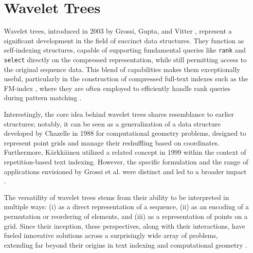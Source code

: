 \clearpage
\section{Wavelet Trees}

Wavelet trees, introduced in 2003 by Grossi, Gupta, and Vitter \cite{GrossiWT2003}, represent a significant development in the field of succinct data structures. They function as self-indexing structures, capable of supporting fundamental queries like \texttt{rank} and \texttt{select} directly on the compressed representation, while still permitting access to the original sequence data. This blend of capabilities makes them exceptionally useful, particularly in the construction of compressed full-text indexes such as the FM-index \cite{ferragina2000opportunistic}, where they are often employed to efficiently handle rank queries during pattern matching \cite{WTForALL}.

Interestingly, the core idea behind wavelet trees shares resemblance to earlier structures; notably, it can be seen as a generalization of a data structure developed by Chazelle in 1988 \cite{Chazelle1988} for computational geometry problems, designed to represent point grids and manage their reshuffling based on coordinates. Furthermore, Kärkkäinen utilized a related concept in 1999 \cite{karkkainen1999repetition} within the context of repetition-based text indexing. However, the specific formulation and the range of applications envisioned by Grossi et al. were distinct and led to a broader impact \cite{WTForALL}.

The versatility of wavelet trees stems from their ability to be interpreted in multiple ways: (i) as a direct representation of a sequence, (ii) as an encoding of a permutation or reordering of elements, and (iii) as a representation of points on a grid. Since their inception, these perspectives, along with their interactions, have fueled innovative solutions across a surprisingly wide array of problems, extending far beyond their origins in text indexing and computational geometry \cite{WTForALL, WTFromTheoryToPractice, TheMyriadVirtuesWT}.

